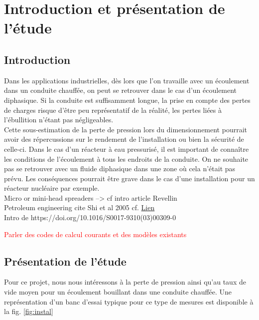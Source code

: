 \section{Introduction et présentation de l'étude\label{section:pres}}

\subsection{Introduction}

Dans les applications industrielles, dès lors que l'on travaille avec un écoulement dans un conduite chauffée, on peut se retrouver dans le cas d'un écoulement diphasique. Si la conduite est suffisamment longue, la prise en compte des pertes de charges risque d'être peu représentatif de la réalité, les pertes liées à l'ébullition n'étant pas négligeables.\\
Cette sous-estimation de la perte de pression lors du dimensionnement pourrait avoir des répercussions sur le rendement de l'installation ou bien la sécurité de celle-ci. Dans le cas d'un réacteur à eau pressurisé, il est important de connaître les conditions de l'écoulement à tous les endroits de la conduite. On ne souhaite pas se retrouver avec un fluide diphasique dans une zone où cela n'était pas prévu. Les conséquences pourrait être grave dans le cas d'une installation pour un réacteur nucléaire par exemple.\\

Micro or mini-head spreaders --> cf intro article Revellin\\

Petroleum engineering cite Shi et al 2005 cf. \href{http://folk.ntnu.no/preisig/HAP_Specials/AdvancedSimulation_files/2014/AdvSim-2014__Matovu_Fahad_Drift-flux\%20models.pdf}{Lien}\\

Intro de https://doi.org/10.1016/S0017-9310(03)00309-0 

\textcolor{red}{Parler des codes de calcul courants et des modèles existants}

\subsection{Présentation de l'étude}

Pour ce projet, nous nous intéressons à la perte de pression ainsi qu'au taux de vide moyen pour un écoulement bouillant dans une conduite chauffée. Une représentation d'un banc d'essai typique pour ce type de mesures est disponible à la fig. \ref{fig:instal}

